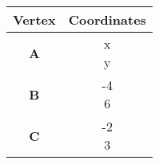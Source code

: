 \begin{tabular}[12pt]{ |c| c|}
    \hline
    \textbf{Vertex} & \textbf{Coordinates}\\ 
    \hline
    \textbf{A} & \myvec{x \\ y} \\
    \hline 
    \textbf{B} & \myvec{-4 \\ 6}\\
    \hline
    \textbf{C} & \myvec{-2 \\ 3}\\
    \hline
    \end{tabular}
